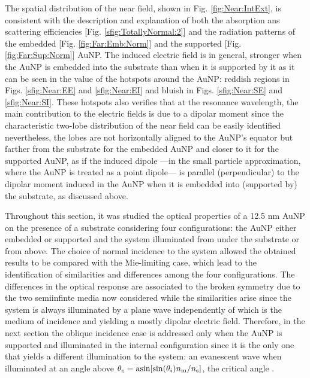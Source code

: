 The spatial distribution of the near field, shown in Fig. \ref{fig:Near:IntExt}, is consistent with the description and explanation of both the absorption ans scattering efficiencies [Fig. \ref{sfig:TotallyNormal:2}] and the radiation patterns of the embedded [Fig. \ref{fig:Far:Emb:Norm}] and the supported [Fig. \ref{fig:Far:Sup:Norm}] AuNP. The induced electric field is in general, stronger when the AuNP is embedded into the substrate than when it is supported by it as it can be seen in the value of the hotspots around the AuNP: reddish regions in Figs. \ref{sfig:Near:EE} and \ref{sfig:Near:EI} and bluish in Figs. \ref{sfig:Near:SE} and \ref{sfig:Near:SI}. These hotspots also verifies that at the resonance wavelength, the main contribution to the electric fields is due to a dipolar moment since the characteristic two-lobe distribution of the near field can be easily identified nevertheless, the lobes are not horizontally aligned to the AuNP's equator but farther from the substrate for the embedded AuNP and closer to it for the supported AuNP, as if the induced dipole ---in the small particle approximation, where the AuNP is treated as a point dipole--- is parallel (perpendicular) to the dipolar moment induced in the AuNP when it is embedded into (supported by) the substrate, as discussed above.

Throughout this section, it was studied the optical properties of a 12.5 nm AuNP on the presence of a substrate considering four configurations: the AuNP either embedded or supported and the system illuminated from under the substrate or from above. The choice of normal incidence to the system allowed the obtained results to be compared with the Mie-limiting case, which lead to the identification of similarities and differences among the four configurations. The differences in the optical response are associated to the broken symmetry due to the two semiinfinte media now considered while the similarities arise since the system is always illuminated by a plane wave independently of which is the medium of incidence and yielding a mostly dipolar electric field. Therefore, in the next section the oblique incidence case is addressed only when the AuNP is supported and illuminated in the internal configuration since it is the only one that yields a different illumination to the system: an evanescent wave when illuminated at an angle above $\theta_c = \asin[\sin(\theta_i) n_\text{m}/n_\text{s}]$, the critical angle \cite{born_max_principle_1999}.
